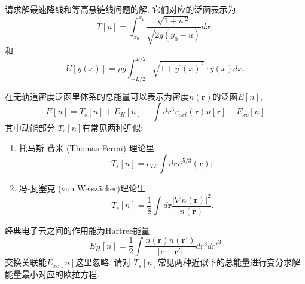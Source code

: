 \documentclass[10pt]{article}
\newenvironment{problem}[2][]{\begin{trivlist}
\item[\hskip \labelsep {\bfseries #1}\hskip \labelsep {\bfseries #2}]}{\end{trivlist}}
\begin{document}
\begin{problem}{5.7}
请求解最速降线和等高悬链线问题的解.
它们对应的泛函表示为
$$
T[u] = \int_{x_0}^{x_1} \frac{\sqrt{1+u^{\prime 2}}}{\sqrt{2 g\left(y_0-u\right)}} d x, 
$$
和
$$
U[y(x)]= \rho g  \int_{-L / 2}^{L / 2} \sqrt{1+y^{\prime}(x)^2} \cdot y(x) d x. 
$$
\end{problem}



\begin{problem}{5.8}
在无轨道密度泛函里体系的总能量可以表示为密度$n(\mathbf{r})$的泛函$E[n]$,
$$
E[n] = T_s[n] + E_H[n] + \int dr^3 v_{ext}(\mathbf{r}) n[\mathbf{r}] + E_{xc}[n]
$$
其中动能部分 $T_s[n]$有常见两种近似:
\begin{enumerate}
  \item 托马斯-费米 (Thomas-Fermi) 理论里
  $$
  T_s[n] = c_{T F} \int d \mathbf{r} n^{5 / 3}(\mathbf{r});
  $$ 
  \item 冯-瓦塞克 (von Weisz\"acker)理论里
  $$
  T_s[n] =  \frac{1}{8} \int d \mathbf{r} \frac{|\nabla n(\mathbf{r})|^2}{n(\mathbf{r})}.
  $$
\end{enumerate}
经典电子云之间的作用能为Hartree能量
$$
E_H[n] = 
 \frac{1}{2} 
 \int \frac{n(\mathbf{r}) n(\mathbf{r}')}{|\mathbf{r} - \mathbf{r}'|}
 dr^3 dr'^3
$$
交换关联能$ E_{xc}[n]$这里忽略. 请对 $T_s[n]$常见两种近似下的总能量进行变分求解能量最小对应的欧拉方程.
\end{problem}
  
\end{document}
